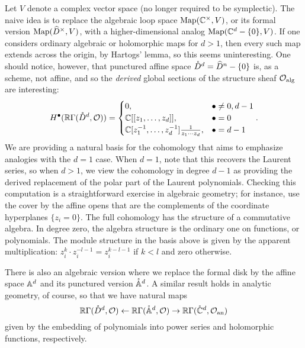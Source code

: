\documentclass[11pt]{amsart}
\begin{document}
Let $V$ denote a complex vector space (no longer required to be symplectic).
The naive idea is to replace the algebraic loop space $\Map(\CC^\times,  V)$, or its formal version $\Map(\Hat{D}^\times, V)$, with a higher-dimensional analog $\Map(\CC^d -\{0\}, V)$.
If one considers ordinary algebraic or holomorphic maps for $d > 1$, 
then every such map extends across the origin, by Hartogs' lemma,
so this seems uninteresting.
One should notice, however, that punctured affine space $\mathring{D}^d = \Hat{D}^n -\{0\}$ is, as a scheme, not affine, 
and so the {\em derived} global sections of the structure sheaf $\cO_{\rm alg}$ are interesting:
\[
H^\bu(\RR \Gamma(\mathring{D}^d, \cO)) = \begin{cases} 
0, & \bu \neq 0, d-1 \\ 
\CC[[z_1,\ldots,z_d]], & \bu = 0 \\ 
\CC[z_1^{-1},\ldots,z_d^{-1}] \frac{1}{z_1 \cdots z_d}, & \bu = d-1 
\end{cases} .
\]
We are providing a natural basis for the cohomology 
that aims to emphasize analogies with the $d=1$ case.
When $d=1$, note that this recovers the Laurent series,
so when $d > 1$, 
we view the cohomology in degree $d-1$ as providing the derived replacement of the polar part of the Laurent polynomials.
Checking this computation is a straightforward exercise in algebraic geometry;
for instance, use the cover by the affine opens that are the complements of the coordinate hyperplanes $\{z_i =0\}$.
The full cohomology has the structure of a commutative algebra. 
In degree zero, the algebra structure is the ordinary one on functions, or polynomials.
The module structure in the basis above is given by the apparent multiplication: $z_i^k \cdot z_i^{-l-1} = z_i^{k-l-1}$ if $k < l$ and zero otherwise.

There is also an algebraic version where we replace the formal disk by the affine space $\AA^d$ and its punctured version $\mathring{\AA}^d$.
A similar result holds in analytic geometry, of course,
so that we have natural maps
\[
\RR \Gamma(\mathring{D}^d, \cO) \leftarrow \RR \Gamma(\mathring{\AA}^d, \cO) \to \RR \Gamma(\mathring{\CC}^d, \cO_{\rm an}) 
\]
given by the embedding of polynomials into power series and holomorphic functions, respectively.
\end{document}
